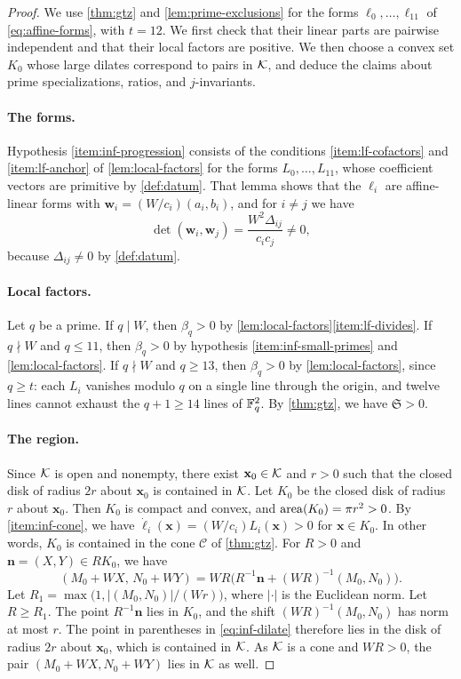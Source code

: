 \begin{proof}
We use \cref{thm:gtz} and \cref{lem:prime-exclusions} for the forms $\ell_0,\dots,\ell_{11}$ of \eqref{eq:affine-forms}, with $t=12$. We first check that their linear parts are pairwise independent and that their local factors are positive. We then choose a convex set $K_0$ whose large dilates correspond to pairs in $\mathcal K$, and deduce the claims about prime specializations, ratios, and $j$-invariants.

\paragraph{The forms.} Hypothesis \ref{item:inf-progression} consists of the conditions \ref{item:lf-cofactors} and \ref{item:lf-anchor} of \cref{lem:local-factors} for the forms $L_0,\dots,L_{11}$, whose coefficient vectors are primitive by \cref{def:datum}. That lemma shows that the $\ell_i$ are affine-linear forms with $\mathbf w_i=(W/c_i)(a_i,b_i)$, and for $i\ne j$ we have
\[
\det(\mathbf w_i,\mathbf w_j)=\frac{W^2\Delta_{ij}}{c_ic_j}\ne0,
\]
because $\Delta_{ij}\ne0$ by \cref{def:datum}.

\paragraph{Local factors.} Let $q$ be a prime. If $q\mid W$, then $\beta_q>0$ by \cref{lem:local-factors}\ref{item:lf-divides}. If $q\nmid W$ and $q\le11$, then $\beta_q>0$ by hypothesis \ref{item:inf-small-primes} and \cref{lem:local-factors}. If $q\nmid W$ and $q\ge13$, then $\beta_q>0$ by \cref{lem:local-factors}, since $q\ge t$: each $L_i$ vanishes modulo $q$ on a single line through the origin, and twelve lines cannot exhaust the $q+1\ge14$ lines of $\mathbb F_q^2$. By \cref{thm:gtz}, we have $\mathfrak S>0$.

\paragraph{The region.} Since $\mathcal K$ is open and nonempty, there exist $\mathbf x_0\in\mathcal K$ and $r>0$ such that the closed disk of radius $2r$ about $\mathbf x_0$ is contained in $\mathcal K$. Let $K_0$ be the closed disk of radius $r$ about $\mathbf x_0$. Then $K_0$ is compact and convex, and $\operatorname{area}(K_0)=\pi r^2>0$. By \ref{item:inf-cone}, we have $\dot\ell_i(\mathbf x)=(W/c_i)L_i(\mathbf x)>0$ for $\mathbf x\in K_0$. In other words, $K_0$ is contained in the cone $\mathcal C$ of \cref{thm:gtz}. For $R>0$ and $\mathbf n=(X,Y)\in RK_0$, we have
\begin{equation}\label{eq:inf-dilate}
(M_0+WX,\,N_0+WY)=WR\Big(R^{-1}\mathbf n+(WR)^{-1}(M_0,N_0)\Big).
\end{equation}
Let $R_1=\max\big(1,|(M_0,N_0)|/(Wr)\big)$, where $|\cdot|$ is the Euclidean norm. Let $R\ge R_1$. The point $R^{-1}\mathbf n$ lies in $K_0$, and the shift $(WR)^{-1}(M_0,N_0)$ has norm at most $r$. The point in parentheses in \eqref{eq:inf-dilate} therefore lies in the disk of radius $2r$ about $\mathbf x_0$, which is contained in $\mathcal K$. As $\mathcal K$ is a cone and $WR>0$, the pair $(M_0+WX,N_0+WY)$ lies in $\mathcal K$ as well.


\end{proof}
